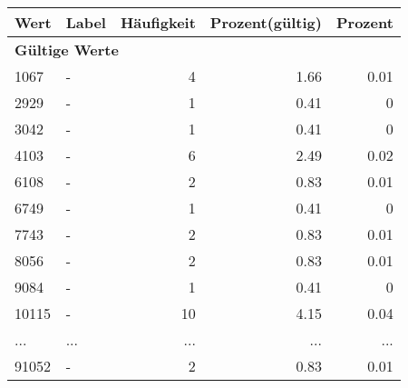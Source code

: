      \begin{longtable}{lXrrr}
     \toprule
     \textbf{Wert} & \textbf{Label} & \textbf{Häufigkeit} & \textbf{Prozent(gültig)} & \textbf{Prozent} \\
     \endhead
     \midrule
     \multicolumn{5}{l}{\textbf{Gültige Werte}}\\
        1067 & \multicolumn{1}{X}{-} & %
          \num{4} &
          \num[round-mode=places,round-precision=2]{1,66} &
          \num[round-mode=places,round-precision=2]{0,01} \\
        2929 & \multicolumn{1}{X}{-} & %
          \num{1} &
          \num[round-mode=places,round-precision=2]{0,41} &
          \num[round-mode=places,round-precision=2]{0} \\
        3042 & \multicolumn{1}{X}{-} & %
          \num{1} &
          \num[round-mode=places,round-precision=2]{0,41} &
          \num[round-mode=places,round-precision=2]{0} \\
        4103 & \multicolumn{1}{X}{-} & %
          \num{6} &
          \num[round-mode=places,round-precision=2]{2,49} &
          \num[round-mode=places,round-precision=2]{0,02} \\
        6108 & \multicolumn{1}{X}{-} & %
          \num{2} &
          \num[round-mode=places,round-precision=2]{0,83} &
          \num[round-mode=places,round-precision=2]{0,01} \\
        6749 & \multicolumn{1}{X}{-} & %
          \num{1} &
          \num[round-mode=places,round-precision=2]{0,41} &
          \num[round-mode=places,round-precision=2]{0} \\
        7743 & \multicolumn{1}{X}{-} & %
          \num{2} &
          \num[round-mode=places,round-precision=2]{0,83} &
          \num[round-mode=places,round-precision=2]{0,01} \\
        8056 & \multicolumn{1}{X}{-} & %
          \num{2} &
          \num[round-mode=places,round-precision=2]{0,83} &
          \num[round-mode=places,round-precision=2]{0,01} \\
        9084 & \multicolumn{1}{X}{-} & %
          \num{1} &
          \num[round-mode=places,round-precision=2]{0,41} &
          \num[round-mode=places,round-precision=2]{0} \\
        10115 & \multicolumn{1}{X}{-} & %
          \num{10} &
          \num[round-mode=places,round-precision=2]{4,15} &
          \num[round-mode=places,round-precision=2]{0,04} \\
       ... & ... & ... & ... & ... \\
        91052 & \multicolumn{1}{X}{-} & %
          \num{2} &
          \num[round-mode=places,round-precision=2]{0,83} &
          \num[round-mode=places,round-precision=2]{0,01} \\


\end{longtable}
